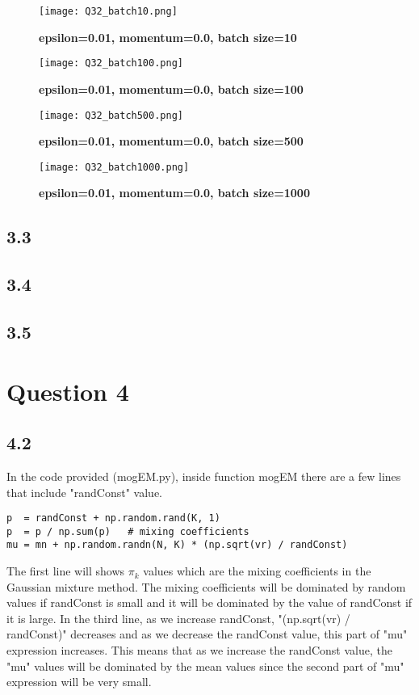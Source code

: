 \documentclass[10pt]{article}
\begin{document}
\begin{figure}[H]
	\centering
	\texttt{[image: Q32\_batch10.png]}
	\caption{\textbf{epsilon=0.01, momentum=0.0, batch size=10}}
	\label{fig:Q32_batch10}
\end{figure}

\begin{figure}[H]
	\centering
	\texttt{[image: Q32\_batch100.png]}
	\caption{\textbf{epsilon=0.01, momentum=0.0, batch size=100}}
	\label{fig:Q32_batch10}
\end{figure}

\begin{figure}[H]
	\centering
	\texttt{[image: Q32\_batch500.png]}
	\caption{\textbf{epsilon=0.01, momentum=0.0, batch size=500}}
	\label{fig:Q32_batch10}
\end{figure}

\begin{figure}[H]
	\centering
	\texttt{[image: Q32\_batch1000.png]}
	\caption{\textbf{epsilon=0.01, momentum=0.0, batch size=1000}}
	\label{fig:Q32_batch10}
\end{figure}



\subsection*{3.3}

\subsection*{3.4}

\subsection*{3.5}

\section*{Question 4}
\subsection*{4.2}
In the code provided (mogEM.py), inside function mogEM there are a few lines that include "randConst" value.
\begin{verbatim}
p  = randConst + np.random.rand(K, 1)
p  = p / np.sum(p)   # mixing coefficients
mu = mn + np.random.randn(N, K) * (np.sqrt(vr) / randConst)
\end{verbatim}
The first line will shows $\pi_k$ values which are the mixing coefficients in the Gaussian mixture method. The mixing coefficients will be dominated by random values if randConst is small and it will be dominated by the value of randConst if it is large.
In the third line, as we increase randConst, "(np.sqrt(vr) / randConst)" decreases and as we decrease the randConst value, this part of "mu" expression increases. This means that as we increase the randConst value, the "mu" values will be dominated by the mean values since the second part of "mu" expression will be very small.
\end{document}
